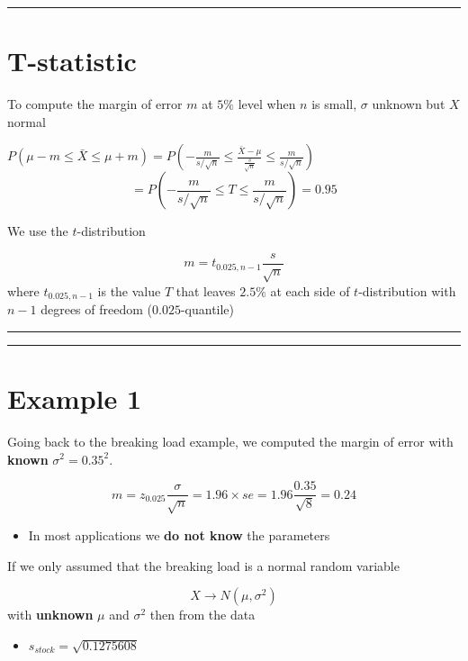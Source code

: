 \documentclass[
]{book}
\providecommand{\tightlist}{%
  \setlength{\itemsep}{0pt}\setlength{\parskip}{0pt}}
\begin{document}
\begin{center}\rule{0.5\linewidth}{0.5pt}\end{center}

\hypertarget{t-statistic-2}{%
\section{T-statistic}\label{t-statistic-2}}

To compute the margin of error \(m\) at \(5\%\) level when \(n\) is small, \(\sigma\) unknown but \(X\) normal

\(P(\mu-m \leq \bar{X} \leq\mu + m)=P(-\frac{m}{s/\sqrt{n}} \leq \frac{\bar{X}-\mu}{\frac{s}{\sqrt{n}}} \leq\frac{m}{s/\sqrt{n}})\)
\[=P(-\frac{m}{s/\sqrt{n}} \leq T \leq\frac{m}{s/\sqrt{n}})=0.95\]

We use the \(t\)-distribution

\[m=t_{0.025, n-1} \frac{s}{\sqrt{n}}\]
where \(t_{0.025, n-1}\) is the value \(T\) that leaves \(2.5\%\) at each side of \(t\)-distribution with \(n-1\) degrees of freedom (\(0.025\)-quantile)

\begin{center}\rule{0.5\linewidth}{0.5pt}\end{center}

\begin{center}\rule{0.5\linewidth}{0.5pt}\end{center}

\hypertarget{example-1-3}{%
\section{Example 1}\label{example-1-3}}

Going back to the breaking load example, we computed the margin of error with \textbf{known} \(\sigma^2=0.35^2\).

\[m=z_{0.025} \frac{\sigma}{\sqrt{n}}=1.96\times se=1.96\frac{0.35}{\sqrt{8}}=0.24\]

\begin{itemize}
\tightlist
\item
  In most applications we \textbf{do not know} the parameters
\end{itemize}

If we only assumed that the breaking load is a normal random variable

\[X \rightarrow N(\mu, \sigma^2)\]
with \textbf{unknown} \(\mu\) and \(\sigma^2\) then from the data

\begin{itemize}
\tightlist
\item
  \(s_{stock}=\sqrt{0.1275608}\)
\end{itemize}
\end{document}
